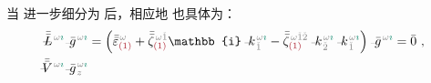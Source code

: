 当  进一步细分为  后，相应地  也具体为：
\begin{subequations} \label{eq:nonlinear(2)-wave_wkrho-simplify6''}
\begin{align}
	\!\!\!\! \Xint{\mathcolor{gray}{-}}{32}{\bar{\bar{L}}}^{\;\! \mathcolor{gray}{\omega} \textcolor{PineGreen}{\imath}} \Xint{{}^{}_{\mathcolor{gray}{-}}}{10}{\bar{g}}^{\;\!\mathcolor{gray}{\omega} \textcolor{PineGreen}{\imath}} &= \left( \bar{\bar{\varepsilon}}^{\;\! \mathcolor{gray}{\omega}}_{\textcolor{Maroon}{(1)}} + \bar{\bar{\zeta}}^{\;\! \mathcolor{gray}{\omega} \mathcolor{gray}{\check{1}}}_{\textcolor{Maroon}{(1)}} \mathbb{i} \Xint{\begin{smallmatrix} ~ \\ {}^{}_{\mathcolor{gray}{-}} \\ ~ \end{smallmatrix}}{15}{k}_{\;\! \mathcolor{gray}{\check{1}}}^{\;\! \mathcolor{gray}{\omega} \textcolor{PineGreen}{\imath}} - \bar{\bar{\zeta}}^{\;\! \mathcolor{gray}{\omega} \mathcolor{gray}{\check{1} \check{2}}}_{\textcolor{Maroon}{(1)}} \Xint{\begin{smallmatrix} ~ \\ {}^{}_{\mathcolor{gray}{-}} \\ ~ \end{smallmatrix}}{15}{k}_{\;\! \mathcolor{gray}{\check{2}}}^{\;\! \mathcolor{gray}{\omega} \textcolor{PineGreen}{\imath}} \Xint{\begin{smallmatrix} ~ \\ {}^{}_{\mathcolor{gray}{-}} \\ ~ \end{smallmatrix}}{15}{k}_{\;\! \mathcolor{gray}{\check{1}}}^{\;\! \mathcolor{gray}{\omega} \textcolor{PineGreen}{\imath}} \right) \Xint{{}^{}_{\mathcolor{gray}{-}}}{10}{\bar{g}}^{\;\!\mathcolor{gray}{\omega} \textcolor{PineGreen}{\imath}} = \bar{0} ~, \label{eq:nonlinear(2)-wave_wkrho-simplify6-L3''} \\
	\!\!\!\! \Xint{\mathcolor{gray}{-}}{25}{\bar{\bar{V}}}^{\;\! \mathcolor{gray}{\omega} \textcolor{PineGreen}{\imath}} \Xint{{}^{}_{\mathcolor{gray}{-}}}{10}{\bar{g}}^{\;\!\mathcolor{gray}{\omega} \textcolor{PineGreen}{\imath}}_{\;\! \mathcolor{gray}{z}}

\end{align}
\end{subequations}
